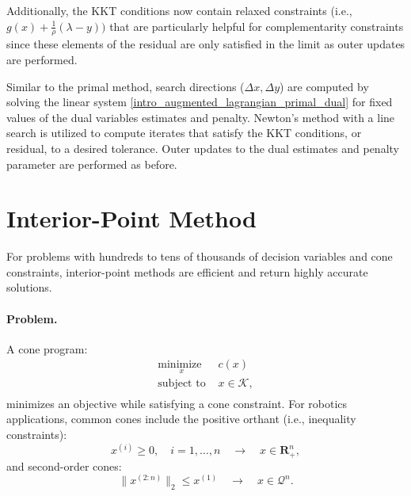 Additionally, the KKT conditions now contain relaxed constraints (i.e., $g(x) + \frac{1}{\rho}(\lambda - y))$ that are particularly helpful for complementarity constraints since these elements of the residual are only satisfied in the limit as outer updates are performed.

Similar to the primal method, search directions ($\Delta x, \Delta y$) are computed by solving the linear system \eqref{intro_augmented_lagrangian_primal_dual} for fixed values of the dual variables estimates and penalty. Newton's method with a line search is utilized to compute iterates that satisfy the KKT conditions, or residual, to a desired tolerance. Outer updates to the dual estimates and penalty parameter are performed as before.

\section{Interior-Point Method}
For problems with hundreds to tens of thousands of decision variables and cone constraints, interior-point methods are efficient and return highly accurate solutions.
\paragraph{Problem.}
A cone program:
\begin{equation}
	\begin{array}{ll}
		\underset{x}{\mbox{minimize }}  & c(x) \\
		\mbox{subject to } & x \in \mathcal{K}, \\
	\end{array}
	\label{intro_cone_program}
\end{equation}
minimizes an objective while satisfying a cone constraint. For robotics applications, common cones include the positive orthant (i.e., inequality constraints):
\begin{equation} 
	x^{(i)} \ge 0, \quad i = 1, \dots, n \quad \rightarrow \quad x \in \mathbf{R}^n_{+},
\end{equation}
and second-order cones:
\begin{equation}
	\|x^{(2:n)}\|_2 \leq x^{(1)} \quad \rightarrow \quad x \in \mathcal{Q}^n.
\end{equation}

